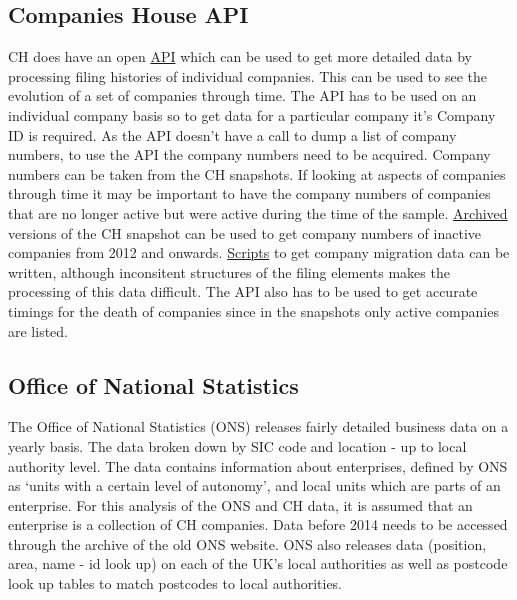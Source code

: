 \documentclass[a4paper,10pt]{article}
\begin{document}
\subsection{Companies House API}
CH does have an open \href{https://developer.companieshouse.gov.uk/api/docs/}{API} which can be used to get more detailed data by processing filing histories of individual companies. This can be used to see the evolution of a set of companies through time. The API has to be used on an individual company basis so to get data for a particular company it's Company ID is required. As the API doesn't have a call to dump a list of company numbers, to use the API the company numbers need to be acquired. Company numbers can be taken from the CH snapshots. If looking at aspects of companies through time it may be important to have the company numbers of companies that are no longer active but were active during the time of the sample. \href{https://web.archive.org/web/*/http://download.companieshouse.gov.uk/en_output.html}{Archived} versions of the CH snapshot can be used to get company numbers of inactive companies from 2012 and onwards. \href{https://github.com/alfredholmes/abm_job_locations/tree/master/Data%20Analysis/CH%20API%20Company%20migrations}{Scripts} to get company migration data can be written, although inconsitent structures of the filing elements makes the processing of this data difficult. The API also has to be used to get accurate timings for the death of companies since in the snapshots only active companies are listed.
\subsection{Office of National Statistics}
The Office of National Statistics (ONS) releases fairly detailed business data on a yearly basis. The data broken down by SIC code and location - up to local authority level. The data contains information about enterprises, defined by ONS as `units with a certain level of autonomy', and local units which are parts of an enterprise. For this analysis of the ONS and CH data, it is assumed that an enterprise is a collection of CH companies. Data before 2014 needs to be accessed through the archive of the old ONS website. ONS also releases data (position, area, name - id look up) on each of the UK's local authorities as well as postcode look up tables to match postcodes to local authorities.
\end{document}
